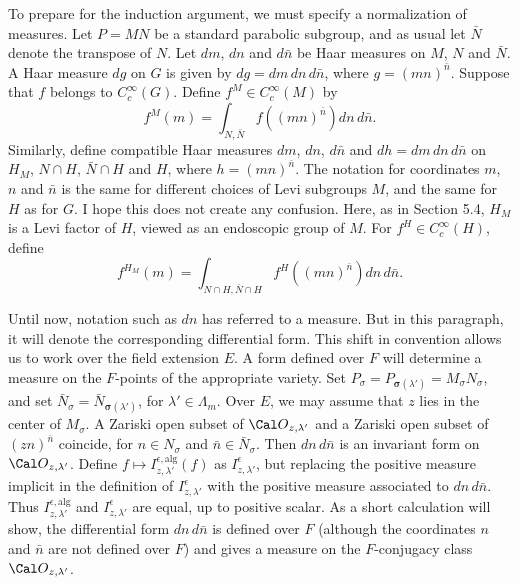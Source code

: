 To prepare for the induction argument, we must specify a normalization
of measures.
Let $P=MN$ be a standard parabolic subgroup, and as usual let $\bar N$
denote the transpose of $N$.
Let $dm$, $dn$  and $d\bar n$ be Haar measures on $M$, $N$ and $\bar N$.
A Haar measure $dg$ on $G$ is given by $dg=dm\,dn\,d\bar n$, where $g = (mn)^{\bar n}$.
Suppose that $f$ belongs to $C_c^\infty(G)$.  Define $f^M\in C_c^\infty(M)$ by
$$f^M(m) = \int_{N,\bar N} f((mn)^{\bar n}) dn\,d\bar n.$$
Similarly, define compatible Haar measures $dm$, $dn$, $d\bar n$ and $dh = dm\,dn\,d\bar n$ on
$H_M$, $N\cap H$, $\bar N\cap H$ and $H$,
where $h=(mn)^{\bar n}$.  The notation for coordinates $m$, $n$ and $\bar n$
is the same for
different choices of Levi subgroups $M$, 
and the same for $H$ as for $G$.
I hope this does not create any confusion.
Here, as in Section 5.4, $H_M$ is a Levi factor of $H$, viewed as
an endoscopic group of $M$.
For $f^H\in C_c^\infty(H)$, define
$$f^{H_M}(m) = \int_{N\cap H,\bar N\cap H} f^H((mn)^{\bar n}) dn\,d\bar n.$$


Until now, notation such as $dn$ has referred to a measure.  But in
this paragraph, it will denote the corresponding differential form.
This shift in convention allows us to work over the field extension
$E$.  A form defined over $F$ will determine a measure on the
$F$-points of the appropriate variety.
Set $P_\sigma = P_{\pmb\sigma(\lambda')} = M_\sigma N_\sigma$, and set 
$\bar N_\sigma= \bar N_{\pmb\sigma(\lambda')}$, for 
$\lambda'\in \Lambda_m$.   
Over $E$, we may assume that $z$ lies in the center of $M_\sigma$.
A Zariski open subset of ${\Cal O}_{z,\lambda'}$ and a Zariski open subset
of $(zn)^{\bar n}$ coincide, for $n\in N_\sigma$ and $\bar n\in \bar N_\sigma$.
Then $dn\,d\bar n$ is an invariant form on ${\Cal O}_{z,\lambda'}$.
Define $f\mapsto I^{\epsilon,\text{alg}}_{z,\lambda'}(f)$ as $I^{\epsilon}_{z,\lambda'}$,
but replacing the positive measure implicit in the definition of $I^{\epsilon}_{z,\lambda'}$
with the positive measure associated to $dn\,d\bar n$.  
Thus $I^{\epsilon,\text{alg}}_{z,\lambda'}$
and $I^\epsilon_{z,\lambda'}$ are equal, up to positive scalar.
As a short calculation will show, the differential form $dn\,d\bar n$ 
is defined over $F$
(although the coordinates
$n$ and $\bar n$ are not defined over $F$)
and gives a measure on the $F$-conjugacy class ${\Cal O}_{z,\lambda'}$.


